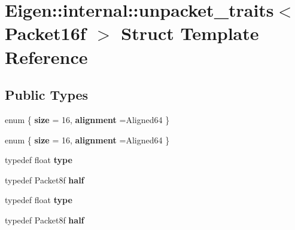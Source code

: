 \hypertarget{struct_eigen_1_1internal_1_1unpacket__traits_3_01_packet16f_01_4}{}\section{Eigen\+:\+:internal\+:\+:unpacket\+\_\+traits$<$ Packet16f $>$ Struct Template Reference}
\label{struct_eigen_1_1internal_1_1unpacket__traits_3_01_packet16f_01_4}
\subsection*{Public Types}
\begin{DoxyCompactItemize}
\item 
\mbox{\label{struct_eigen_1_1internal_1_1unpacket__traits_3_01_packet16f_01_4_a6e2c0e7c12ebfd3966a7bb8815dc8f34}} 
enum \{ {\bfseries size} = 16, 
{\bfseries alignment} =Aligned64
 \}
\item 
\mbox{\label{struct_eigen_1_1internal_1_1unpacket__traits_3_01_packet16f_01_4_a6a590914d6067faf04a570f41966ec73}} 
enum \{ {\bfseries size} = 16, 
{\bfseries alignment} =Aligned64
 \}
\item 
\mbox{\label{struct_eigen_1_1internal_1_1unpacket__traits_3_01_packet16f_01_4_a92fc65b0a79e1b15693b0fca253c610f}} 
typedef float {\bfseries type}
\item 
\mbox{\label{struct_eigen_1_1internal_1_1unpacket__traits_3_01_packet16f_01_4_ab7f53faa37c6cc9a8c1f93ee13479dea}} 
typedef Packet8f {\bfseries half}
\item 
\mbox{\label{struct_eigen_1_1internal_1_1unpacket__traits_3_01_packet16f_01_4_a92fc65b0a79e1b15693b0fca253c610f}} 
typedef float {\bfseries type}
\item 
\mbox{\label{struct_eigen_1_1internal_1_1unpacket__traits_3_01_packet16f_01_4_ab7f53faa37c6cc9a8c1f93ee13479dea}} 
typedef Packet8f {\bfseries half}
\end{DoxyCompactItemize}



